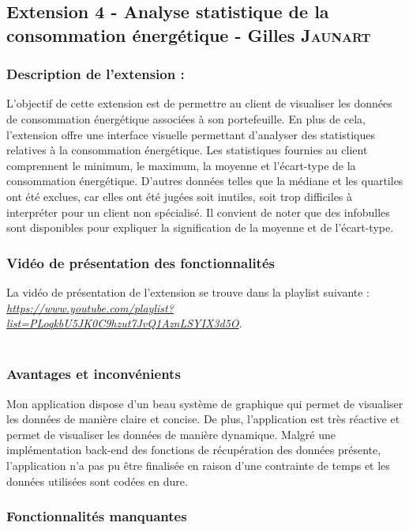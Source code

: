 \documentclass[../rapport.tex]{subfiles}
\begin{document}
\subsection{Extension 4 - Analyse statistique de la consommation énergétique - Gilles \textsc{Jaunart}}

\subsubsection{Description de l'extension :}

L'objectif de cette extension est de permettre au client de visualiser les données de consommation énergétique associées à son portefeuille. En plus de cela, l'extension offre une interface visuelle permettant d'analyser des statistiques relatives à la consommation énergétique. 
Les statistiques fournies au client comprennent le minimum, le maximum, la moyenne et l'écart-type de la consommation énergétique. D'autres données telles que la médiane et les quartiles ont été exclues, car elles ont été jugées soit inutiles, soit trop difficiles à interpréter pour un client non spécialisé. Il convient de noter que des infobulles sont disponibles pour expliquer la signification de la moyenne et de l'écart-type. 

\subsubsection{Vidéo de présentation des fonctionnalités} 
La vidéo de présentation de l'extension se trouve dans la playlist suivante : \href{https://www.youtube.com/playlist?list=PLoqkbU5JK0C9hzut7JvQ1AznLSYIX3d5O}{\textit{https://www.youtube.com/playlist?list=PLoqkbU5JK0C9hzut7JvQ1AznLSYIX3d5O}}. \\ \\

\subsubsection{Avantages et inconvénients} 
Mon application dispose d'un beau système de graphique qui permet de visualiser les données de manière claire et concise. De plus, l'application est très réactive et permet de visualiser les données de manière dynamique. Malgré une implémentation back-end des fonctions de récupération des données présente, l'application n'a pas pu être finalisée en raison d'une contrainte de temps et les données utilisées sont codées en dure.

\subsubsection{Fonctionnalités manquantes} 
\end{document}
